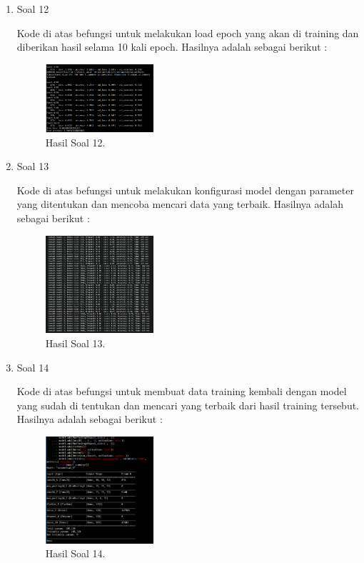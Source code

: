 \begin{enumerate}
	\item Soal 12
	\hfill\break
	
	Kode di atas befungsi untuk melakukan load epoch yang akan di training dan diberikan hasil selama 10 kali epoch. Hasilnya adalah sebagai berikut :  
	\begin{figure}[H]
	\centering
		\includegraphics[width=4cm]{figures/1174073/tugas7/materi/hasil12.PNG}
		\caption{Hasil Soal 12.}
	\end{figure}

	\item Soal 13
	\hfill\break
	
	Kode di atas befungsi untuk melakukan konfigurasi model dengan parameter yang ditentukan dan mencoba mencari data yang terbaik. Hasilnya adalah sebagai berikut :  
	\begin{figure}[H]
	\centering
		\includegraphics[width=4cm]{figures/1174073/tugas7/materi/hasil13.PNG}
		\caption{Hasil Soal 13.}
	\end{figure}

	\item Soal 14
	\hfill\break
	
	Kode di atas befungsi untuk membuat data training kembali dengan model yang sudah di tentukan dan mencari yang terbaik dari hasil training tersebut. Hasilnya adalah sebagai berikut :  
	\begin{figure}[H]
	\centering
		\includegraphics[width=4cm]{figures/1174073/tugas7/materi/hasil14.PNG}
		\caption{Hasil Soal 14.}
	\end{figure}


\end{enumerate}
